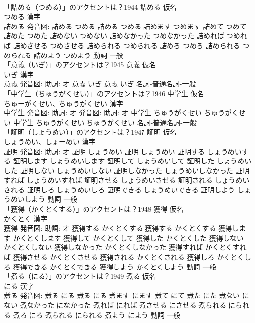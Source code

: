 \documentclass[8pt]{extreport}
\begin{document}
\begin{CJK}{UTF8}{min}
\\	「詰める（つめる）」のアクセントは？1944	詰める 仮名　
\\	つめる 漢字　
\\	詰める 発音図:	詰める つめる		詰める つめる 詰めます つめます 詰めて つめて 詰めた つめた 詰めない つめない 詰めなかった つめなかった 詰めれば つめれば 詰めさせる つめさせる 詰められる つめられる 詰めろ つめろ 詰められる つめられる 詰めよう つめよう				動詞-一般 
\\	「意義（いぎ）」のアクセントは？1945	意義 仮名　
\\	いぎ 漢字　
\\	意義 発音図: 助詞: オ	意義 いぎ		意義 いぎ				名詞-普通名詞-一般 
\\	「中学生（ちゅうがくせい）」のアクセントは？1946	中学生 仮名　
\\	ちゅーがくせい、ちゅうがくせい 漢字　
\\	中学生 発音図: 助詞: オ 発音図: 助詞: オ	中学生 ちゅうがくせい ちゅうがくせい		中学生 ちゅうがくせい ちゅうがくせい				名詞-普通名詞-一般 
\\	「証明（しょうめい）」のアクセントは？1947	証明 仮名　
\\	しょうめい、しょーめい 漢字　
\\	証明 発音図: 助詞: オ	証明 しょうめい		証明 しょうめい 証明する しょうめいする 証明します しょうめいします 証明して しょうめいして 証明した しょうめいした 証明しない しょうめいしない 証明しなかった しょうめいしなかった 証明すれば しょうめいすれば 証明させる しょうめいさせる 証明される しょうめいされる 証明しろ しょうめいしろ 証明できる しょうめいできる 証明しよう しょうめいしよう				動詞-一般 
\\	「獲得（かくとくする）」のアクセントは？1948	獲得 仮名　
\\	かくとく 漢字　
\\	獲得 発音図: 助詞: オ	獲得する かくとくする		獲得する かくとくする 獲得します かくとくします 獲得して かくとくして 獲得した かくとくした 獲得しない かくとくしない 獲得しなかった かくとくしなかった 獲得すれば かくとくすれば 獲得させる かくとくさせる 獲得される かくとくされる 獲得しろ かくとくしろ 獲得できる かくとくできる 獲得しよう かくとくしよう				動詞-一般 
\\	「煮る（にる）」のアクセントは？1949	煮る 仮名　
\\	にる 漢字　
\\	煮る 発音図:	煮る にる		煮る にる 煮ます にます 煮て にて 煮た にた 煮ない にない 煮なかった になかった 煮れば にれば 煮させる にさせる 煮られる にられる 煮ろ にろ 煮られる にられる 煮よう によう				動詞-一般 

\end{CJK}
\end{document}
